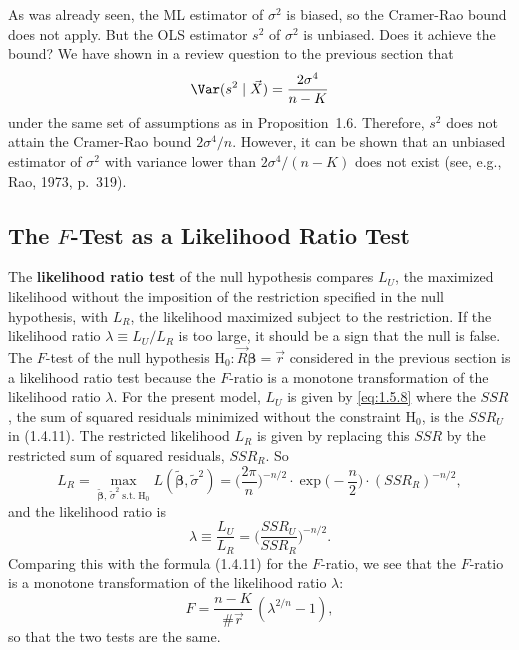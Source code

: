 As was already seen, the ML estimator of $\sigma^2$ is biased, so the Cramer-Rao bound
does not apply.  But the OLS estimator $s^2$ of $\sigma^2$ is unbiased.  Does it achieve
the bound?  We have shown in a review question to the previous section that
%
\[
  \Var(s^2 \mid \vec{X}) = \frac{2\sigma^4}{n - K}
\]
%
under the same set of assumptions as in Proposition~1.6.  Therefore, $s^2$ does not attain
the Cramer-Rao bound $2\sigma^4/n$.  However, it can be shown that an unbiased estimator of
$\sigma^2$ with variance lower than $2\sigma^4/(n - K)$ does not exist (see, e.g., Rao,
1973, p.~319).

\subsection*{The $F$-Test as a Likelihood Ratio Test}

The \textbf{likelihood ratio test} of the null hypothesis compares $L_U$, the maximized
likelihood without the imposition of the restriction specified in the null hypothesis, with
$L_R$, the likelihood maximized subject to the restriction.  If the likelihood ratio
$\lambda \equiv L_U / L_R$ is too large, it should be a sign that the null is false.  The
$F$-test of the null hypothesis $\mathrm{H}_0\colon \vec{R}\bm{\beta} = \vec{r}$ considered
in the previous section is a likelihood ratio test because the $F$-ratio is a monotone
transformation of the likelihood ratio $\lambda$.  For the present model, $L_U$ is given by
\eqref{eq:1.5.8} where the $SSR$, the sum of squared residuals minimized without the
constraint $\mathrm{H}_0$, is the $SSR_U$ in (1.4.11).  The restricted likelihood $L_R$ is
given by replacing this $SSR$ by the restricted sum of squared residuals, $SSR_R$.  So
%
\begin{equation}
  L_R
    = \max_{\widetilde{\bm{\beta}},\,\tilde{\sigma}^2
            \;\text{s.t.}\;\mathrm{H}_0}
      L(\widetilde{\bm{\beta}}, \tilde{\sigma}^2)
    = \biggl(\frac{2\pi}{n}\biggr)^{-n/2}
      \cdot \exp\!\biggl(-\frac{n}{2}\biggr)
      \cdot (SSR_R)^{-n/2},
  \label{eq:1.5.17}
\end{equation}
%
and the likelihood ratio is
%
\begin{equation}
  \lambda
    \equiv \frac{L_U}{L_R}
    = \biggl(\frac{SSR_U}{SSR_R}\biggr)^{-n/2}.
  \label{eq:1.5.18}
\end{equation}
%
Comparing this with the formula (1.4.11) for the $F$-ratio, we see that the $F$-ratio is a
monotone transformation of the likelihood ratio $\lambda$:
%
\begin{equation}
  F = \frac{n - K}{\#\vec{r}}\,(\lambda^{2/n} - 1),
  \label{eq:1.5.19}
\end{equation}
%
so that the two tests are the same.

